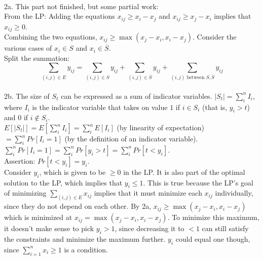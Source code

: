\myalgsheader

\pagestyle{plain}


\bigskip



\hrulefill \\

2a. This part not finished, but some partial work:\\

From the LP: Adding the equations $x_{ij} \geq x_i - x_j$ and $x_{ij} \geq x_j - x_i$ implies that $x_{ij} \geq 0$. \\

Combining the two equations, $x_{ij} \geq \max(x_j - x_i, x_i - x_j)$. Consider the various cases of $x_i \in S$ and $x_i \in \overline{S}$. \\

Split the summation:\\

$$\sum_{(i, j) \in E}y_{ij} = \sum_{(i, j) \in S}y_{ij} + \sum_{(i, j) \in \overline{S}}y_{ij} + \sum_{(i, j) \textrm{ between } S, \overline{S}}y_{ij}$$\\



2b. The size of $S_t$ can be expressed as a sum of indicator variables. $|S_t| = \sum_i^n I_i$, where $I_i$ is the indicator variable that takes on value $1$ if $i \in S_i$ (that is, $y_i > t$) and 0 if $i \not\in S_i$.\\

$E[|S_t|] = E[\sum_i^n I_i] = \sum_i^n E[I_i]$ (by linearity of expectation) $ = \sum_i^n Pr[I_i = 1]$ (by the definition of an indicator variable).\\

$\sum_i^n Pr[I_i = 1] = \sum_i^n Pr[y_i > t] = \sum_i^n Pr[t < y_i]$.\\

Assertion: $Pr[t < y_i] = y_i$.\\

Consider $y_i$, which is given to be $\geq 0$ in the LP. It is also part of the optimal solution to the LP, which implies that $y_i \leq 1$. This is true because the LP's goal of minimizing $\sum_{(i, j) \in E}x_{ij}$ implies that it must minimize each $x_{ij}$ individually, since they do not depend on each other. By 2a, $x_{ij} \geq \max(x_j - x_i, x_i - x_j)$ which is minimized at $x_{ij} = \max(x_j - x_i, x_i - x_j)$. To minimize this maximum, it doesn't make sense to pick $y_i > 1$, since decreasing it to $< 1$ can still satisfy the constraints and minimize the maximum further. $y_i$ could equal one though, since $\sum_{i=1}^n x_i \geq 1$ is a condition.\\

